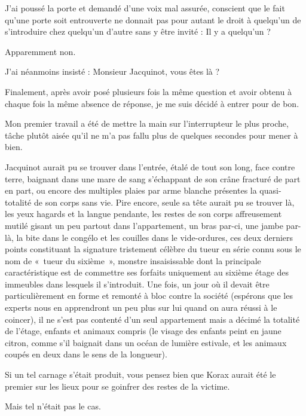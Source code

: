 J’ai poussé la porte et demandé d’une voix mal assurée, conscient que le fait qu’une porte soit entrouverte ne donnait pas pour autant le droit à quelqu’un de s’introduire chez quelqu’un d’autre sans y être invité : Il y a quelqu’un ?

Apparemment non.

J’ai néanmoins insisté : Monsieur Jacquinot, vous êtes là ?

Finalement, après avoir posé plusieurs fois la même question et avoir obtenu à chaque fois la même absence de réponse, je me suis décidé à entrer pour de bon.

Mon premier travail a été de mettre la main sur l’interrupteur le plus proche, tâche plutôt aisée qu’il ne m’a pas fallu plus de quelques secondes pour mener à bien.

Jacquinot aurait pu se trouver dans l’entrée, étalé de tout son long, face contre terre, baignant dans une mare de sang s’échappant de son crâne fracturé de part en part, ou encore des multiples plaies par arme blanche présentes la quasi-totalité de son corps sans vie. Pire encore, seule sa tête aurait pu se trouver là, les yeux hagards et la langue pendante, les restes de son corps affreusement mutilé gisant un peu partout dans l’appartement, un bras par-ci, une jambe par-là, la bite dans le congélo et les couilles dans le vide-ordures, ces deux derniers points constituant la signature tristement célèbre du tueur en série connu sous le nom de «~tueur du sixième~», monstre insaisissable dont la principale caractéristique est de commettre ses forfaits uniquement au sixième étage des immeubles dans lesquels il s’introduit. Une fois, un jour où il devait être particulièrement en forme et remonté à bloc contre la société (espérons que les experts nous en apprendront un peu plus sur lui quand on aura réussi à le coincer), il ne s’est pas contenté d’un seul appartement mais a décimé la totalité de l’étage, enfants et animaux compris (le visage des enfants peint en jaune citron, comme s’il baignait dans un océan de lumière estivale, et les animaux coupés en deux dans le sens de la longueur).

Si un tel carnage s’était produit, vous pensez bien que Korax aurait été le premier sur les lieux pour se goinfrer des restes de la victime.

Mais tel n’était pas le cas.

